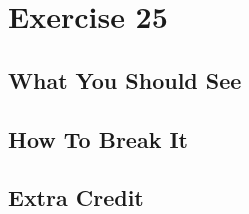 \chapter{Exercise 25}


\section{What You Should See}


\section{How To Break It}


\section{Extra Credit}



